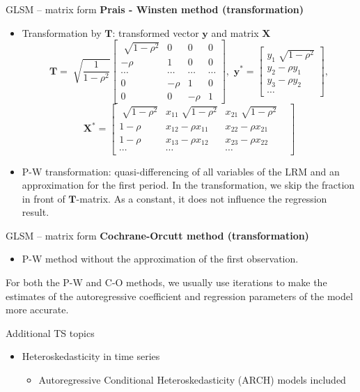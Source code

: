 \documentclass{beamer}
\begin{document}
\begin{frame}{GLSM – matrix form}
\textbf{Prais - Winsten method (transformation)}
\begin{itemize}
\item Transformation by $\boldsymbol{T}$: transformed vector $\boldsymbol{y}$ and matrix $\boldsymbol{X}$
$$\boldsymbol{T}=\sqrt[]{\frac{1}{1-\rho^2}}
\begin{bmatrix}
 \sqrt[]{1-\rho^2}&  0 & 0 & 0\\
 - \rho &  1&  0 & 0\\ 
 \cdots & \cdots & \cdots & \cdots \\
0 &  -\rho &  1& 0\\ 
0 & 0 & -\rho &1 
\end{bmatrix}, \,\,
\boldsymbol{y^\ast}=
\begin{bmatrix}
y_1\sqrt[]{1-\rho^2}\\
y_2-\rho y_1\\
y_3-\rho y_2 \\
\cdots
\end{bmatrix},
$$ $$
\boldsymbol{X^\ast}=\begin{bmatrix}
\sqrt[]{1-\rho^2} & x_{11}\sqrt[]{1-\rho^2} & x_{21}\sqrt[]{1-\rho^2}\\
1-\rho & x_{12}-\rho x_{11} & x_{22}-\rho x_{21} \\
1-\rho & x_{13}-\rho x_{12} & x_{23}-\rho x_{22} \\
\cdots & \cdots & \cdots &
\end{bmatrix}
$$

\item P-W  transformation: quasi-differencing of all variables of the LRM and an approximation for the first period. In the transformation, we skip the fraction in front of $\boldsymbol{T}$-matrix. As a constant, it does not influence the regression result.

\end{itemize}
\end{frame}


\begin{frame}{GLSM – matrix form}
\textbf{Cochrane-Orcutt method (transformation)}
\begin{itemize}
\item P-W method without the approximation of the first observation.
\end{itemize}

\vspace{1cm}

For both the P-W and C-O methods, we usually use iterations to make the estimates of the autoregressive coefficient and regression parameters of the model more accurate.

\end{frame}


\begin{frame}{Additional TS topics}
\begin{itemize}
\item Heteroskedasticity in time series
\vspace{1cm}
\begin{itemize}
\item Autoregressive Conditional Heteroskedasticity (ARCH) models included
\end{itemize}
\end{itemize}
\end{frame}
\end{document}
